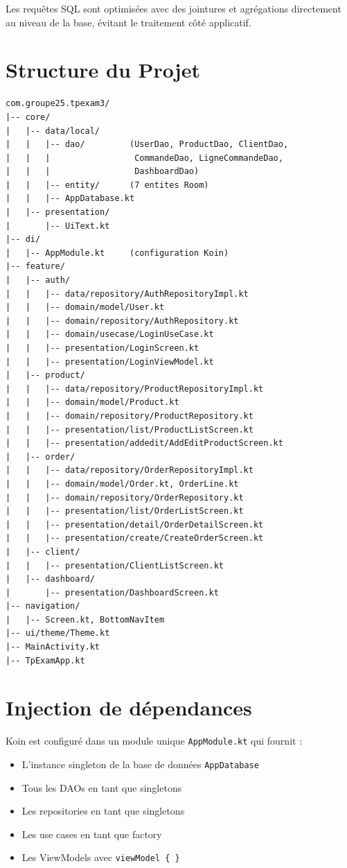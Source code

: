 \documentclass[12pt,a4paper]{article}
\begin{document}
Les requ\^etes SQL sont optimis\'ees avec des jointures et agr\'egations directement au niveau de la base, \'evitant le traitement c\^ot\'e applicatif.

\section{Structure du Projet}

\begin{lstlisting}[language={}, title={Arborescence des packages}]
com.groupe25.tpexam3/
|-- core/
|   |-- data/local/
|   |   |-- dao/         (UserDao, ProductDao, ClientDao,
|   |   |                 CommandeDao, LigneCommandeDao,
|   |   |                 DashboardDao)
|   |   |-- entity/      (7 entites Room)
|   |   |-- AppDatabase.kt
|   |-- presentation/
|       |-- UiText.kt
|-- di/
|   |-- AppModule.kt     (configuration Koin)
|-- feature/
|   |-- auth/
|   |   |-- data/repository/AuthRepositoryImpl.kt
|   |   |-- domain/model/User.kt
|   |   |-- domain/repository/AuthRepository.kt
|   |   |-- domain/usecase/LoginUseCase.kt
|   |   |-- presentation/LoginScreen.kt
|   |   |-- presentation/LoginViewModel.kt
|   |-- product/
|   |   |-- data/repository/ProductRepositoryImpl.kt
|   |   |-- domain/model/Product.kt
|   |   |-- domain/repository/ProductRepository.kt
|   |   |-- presentation/list/ProductListScreen.kt
|   |   |-- presentation/addedit/AddEditProductScreen.kt
|   |-- order/
|   |   |-- data/repository/OrderRepositoryImpl.kt
|   |   |-- domain/model/Order.kt, OrderLine.kt
|   |   |-- domain/repository/OrderRepository.kt
|   |   |-- presentation/list/OrderListScreen.kt
|   |   |-- presentation/detail/OrderDetailScreen.kt
|   |   |-- presentation/create/CreateOrderScreen.kt
|   |-- client/
|   |   |-- presentation/ClientListScreen.kt
|   |-- dashboard/
|       |-- presentation/DashboardScreen.kt
|-- navigation/
|   |-- Screen.kt, BottomNavItem
|-- ui/theme/Theme.kt
|-- MainActivity.kt
|-- TpExamApp.kt
\end{lstlisting}

\section{Injection de d\'ependances}

Koin est configur\'e dans un module unique \texttt{AppModule.kt} qui fournit :
\begin{itemize}
    \item L'instance singleton de la base de donn\'ees \texttt{AppDatabase}
    \item Tous les DAOs en tant que singletons
    \item Les repositories en tant que singletons
    \item Les use cases en tant que factory
    \item Les ViewModels avec \texttt{viewModel \{ \}}
\end{itemize}
\end{document}
